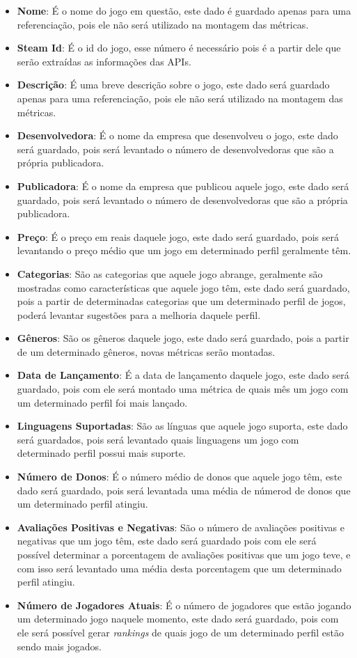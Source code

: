 \begin{itemize}
	\item \textbf{Nome}: É o nome do jogo em questão, este dado é guardado apenas para uma referenciação, pois ele não será utilizado na montagem das métricas.
	\item \textbf{Steam Id}: É o id do jogo, esse número é necessário pois é a partir dele que serão extraídas as informações das APIs.
	\item \textbf{Descrição}: É uma breve descrição sobre o jogo, este dado será guardado apenas para uma referenciação, pois ele não será utilizado na montagem das métricas.
	\item \textbf{Desenvolvedora}: É o nome da empresa que desenvolveu o jogo, este dado será guardado, pois será levantado o número de desenvolvedoras que são a própria publicadora.
	\item \textbf{Publicadora}: É o nome da empresa que publicou aquele jogo, este dado será guardado, pois será levantado o número de desenvolvedoras que são a própria publicadora.
	\item \textbf{Preço}: É o preço em reais daquele jogo, este dado será guardado, pois será levantando o preço médio que um jogo em determinado perfil geralmente têm.
	\item \textbf{Categorias}: São as categorias que aquele jogo abrange, geralmente são mostradas como características que aquele jogo têm, este dado será guardado, pois a partir de determinadas categorias que um determinado perfil de jogos, poderá levantar sugestões para a melhoria daquele perfil.
	\item \textbf{Gêneros}: São os gêneros daquele jogo, este dado será guardado, pois a partir de um determinado gêneros, novas métricas serão montadas.
	\item \textbf{Data de Lançamento}: É a data de lançamento daquele jogo, este dado será guardado, pois com ele será montado uma métrica de quais mês um jogo com um determinado perfil foi mais lançado.
	\item \textbf{Linguagens Suportadas}: São as línguas que aquele jogo suporta, este dado será guardados, pois será levantado quais linguagens um jogo com determinado perfil possui mais suporte.
	\item \textbf{Número de Donos}: É o número médio de donos que aquele jogo têm, este dado será guardado, pois será levantada uma média de númerod de donos que um determinado perfil atingiu.
	\item \textbf{Avaliações Positivas e Negativas}: São o número de avaliações positivas e negativas que um jogo têm, este dado será guardado pois com ele será possível determinar a porcentagem de avaliações positivas que um jogo teve, e com isso será levantado uma média desta porcentagem que um determinado perfil atingiu.
	\item \textbf{Número de Jogadores Atuais}: É o número de jogadores que estão jogando um determinado jogo naquele momento, este dado será guardado, pois com ele será possível gerar \textit{rankings} de quais jogo de um determinado perfil estão sendo mais jogados.
\end{itemize}
